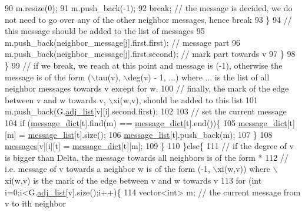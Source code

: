 \begin{DoxyCode}
90                 m.resize(0);
91                 m.push\_back(-1);
92                 \textcolor{keywordflow}{break}; \textcolor{comment}{// the message is decided, we do not need to go over any of the other neighbor
       messages, hence break}
93               \}
94               \textcolor{comment}{// this message should be added to the list of messages}
95               m.push\_back(neighbor\_message[j].first.first); \textcolor{comment}{// message part}
96               m.push\_back(neighbor\_message[j].first.second); \textcolor{comment}{// mark part towards v}
97             \}
98           \}
99           \textcolor{comment}{// if we break, we reach at this point and message is (-1), otherwise the message is of the form
       (\(\backslash\)tau(v), \(\backslash\)deg(v) - 1, ...) where ... is the list of all neighbor messages towards v except for w. }
100           \textcolor{comment}{// finally, the mark of the edge between v and w towards v, \(\backslash\)xi(w,v), should be added to this
       list}
101           m.push\_back(G.\hyperlink{classmarked__graph_a1a0bf7ca413a278763f7c878b3b6fd6f}{adj\_list}[v][i].second.first);
102 
103           \textcolor{comment}{// set the current message}
104           \textcolor{keywordflow}{if} (\hyperlink{classgraph__message_ad0a6d35ac8550fb7ff03ce90fce7d5a5}{message\_dict}[t].find(m) == \hyperlink{classgraph__message_ad0a6d35ac8550fb7ff03ce90fce7d5a5}{message\_dict}[t].end())\{
105             \hyperlink{classgraph__message_ad0a6d35ac8550fb7ff03ce90fce7d5a5}{message\_dict}[t][m] = \hyperlink{classgraph__message_aa17fdb629b423343edfafa97252763ef}{message\_list}[t].size();
106             \hyperlink{classgraph__message_aa17fdb629b423343edfafa97252763ef}{message\_list}[t].push\_back(m);
107           \}
108           \hyperlink{classgraph__message_aac77e098f0acf9650116a8e51fe3b4b7}{messages}[v][i][t] = \hyperlink{classgraph__message_ad0a6d35ac8550fb7ff03ce90fce7d5a5}{message\_dict}[t][m];
109         \}
110       \}\textcolor{keywordflow}{else}\{
111         \textcolor{comment}{// if the degree of v is bigger than Delta, the message towards all neighbors is of the form *}
112         \textcolor{comment}{// i.e. message of v towards a neighbor w is of the form (-1, \(\backslash\)xi(w,v)) where \(\backslash\)xi(w,v) is the mark
       of the edge between v and w towards v}
113         \textcolor{keywordflow}{for} (\textcolor{keywordtype}{int} i=0;i<G.\hyperlink{classmarked__graph_a1a0bf7ca413a278763f7c878b3b6fd6f}{adj\_list}[v].size();i++)\{
114           vector<int> m; \textcolor{comment}{// the current message from v to ith neighbor}

\end{DoxyCode}
